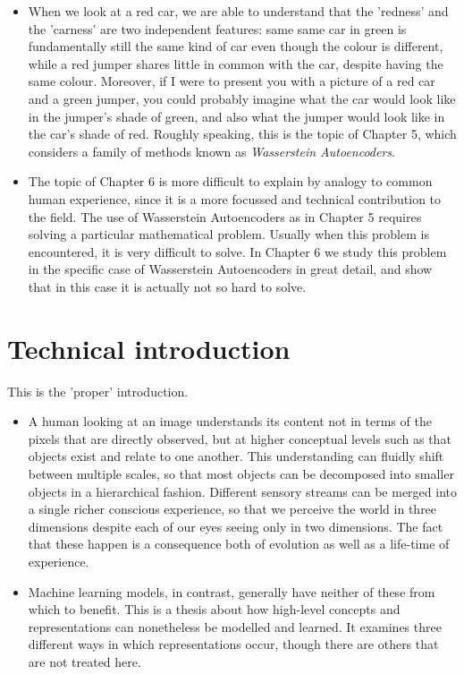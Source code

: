 \begin{itemize}
\item When we look at a red car, we are able to understand that the 'redness' and the 'carness' are two independent features: same same car in green is fundamentally still the same kind of car even though the colour is different, while a red jumper shares little in common with the car, despite having the same colour. Moreover, if I were to present you with a picture of a red car and a green jumper, you could probably imagine what the car would look like in the jumper's shade of green, and also what the jumper would look like in the car's shade of red. Roughly speaking, this is the topic of Chapter 5, which considers a family of methods known as \emph{Wasserstein Autoencoders}.
\item The topic of Chapter 6 is more difficult to explain by analogy to common human experience, since it is a more focussed and technical contribution to the field. The use of Wasserstein Autoencoders as in Chapter 5 requires solving a particular mathematical problem. Usually when this problem is encountered, it is very difficult to solve. In Chapter 6 we study this problem in the specific case of Wasserstein Autoencoders in great detail, and show that in this case it is actually not so hard to solve. 
\end{itemize}


\section{Technical introduction}

This is the 'proper' introduction.

\begin{itemize}
\item A human looking at an image understands its content not in terms of the pixels that are directly observed, but at higher conceptual levels such as that objects exist and relate to one another. This understanding can fluidly shift between multiple scales, so that most objects can be decomposed into smaller objects in a hierarchical fashion. Different sensory streams can be merged into a single richer conscious experience, so that we perceive the world in three dimensions despite each of our eyes seeing only in two dimensions. 
The fact that these happen is a consequence both of evolution as well as a life-time of experience.
\item Machine learning models, in contrast, generally have neither of these from which to benefit. This is a thesis about how high-level concepts and representations can nonetheless be modelled and learned. It examines three different ways in which representations occur, though there are others that are not treated here. 
\end{itemize}

